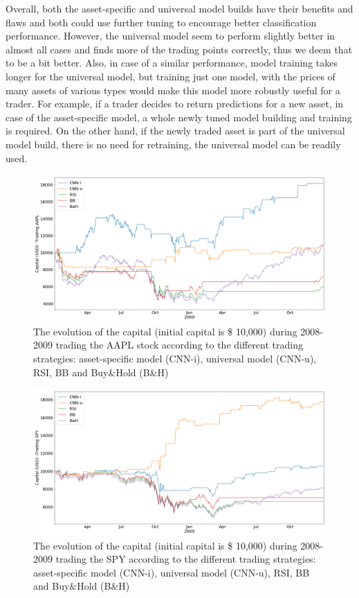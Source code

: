 \documentclass[11pt, a4paper]{article}
\begin{document}
Overall, both the asset-specific and universal model builds have their benefits and flaws and both could use further tuning to encourage better classification performance. However, the universal model seem to perform slightly better in almost all cases and finds more of the trading points correctly, thus we deem that to be a bit better. Also, in case of a similar performance, model training takes longer for the universal model, but training just one model, with the prices of many assets of various types would make this model more robustly useful for a trader. 
For example, if a trader decides to return predictions for a new asset, in case of the asset-specific model, a whole newly tuned model building and training is required. On the other hand, if the newly traded asset is part of the universal model build, there is no need for retraining, the universal model can be readily used.
\begin{figure}[H]
    \centering
    \includegraphics[width=\textwidth]{images/capitals/Capitals2_AAPL.png}
    \caption{The evolution of the capital (initial capital is \$ 10,000) during 2008-2009 trading the AAPL stock according to the different trading strategies: asset-specific model (CNN-i), universal model (CNN-u), RSI, BB and Buy\&Hold (B\&H)}
    \label{fig:AAPLcapevol}
\end{figure}
\begin{figure}[H]
    \centering
    \includegraphics[width=\textwidth]{images/capitals/Capitals2_SPY.png}
    \caption{The evolution of the capital (initial capital is \$ 10,000) during 2008-2009 trading the SPY according to the different trading strategies: asset-specific model (CNN-i), universal model (CNN-u), RSI, BB and Buy\&Hold (B\&H)}
    \label{fig:SPYcapevol}
\end{figure}
\end{document}
